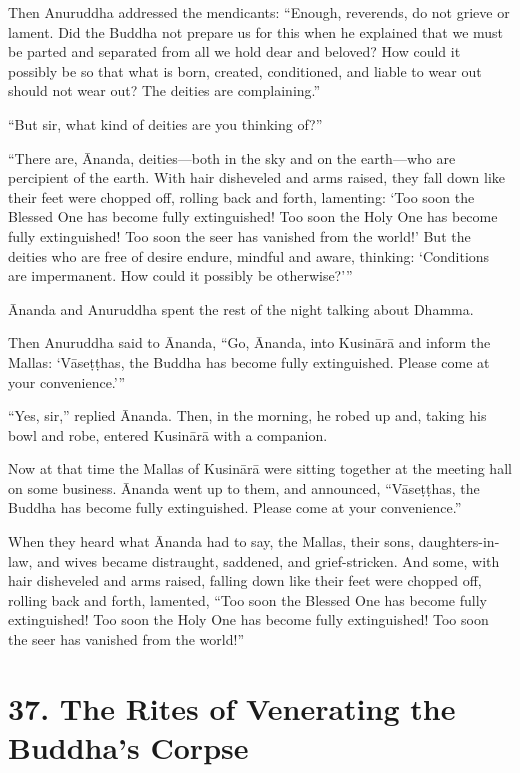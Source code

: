 \documentclass[12pt,openany]{book}%
\begin{document}
Then Anuruddha addressed the mendicants: “Enough, reverends, do not grieve or lament. Did the Buddha not prepare us for this when he explained that we must be parted and separated from all we hold dear and beloved? How could it possibly be so that what is born, created, conditioned, and liable to wear out should not wear out? The deities are complaining.” 

“But sir, what kind of deities are you thinking of?” 

“There are, Ānanda, deities—both in the sky and on the earth—who are percipient of the earth. With hair disheveled and arms raised, they fall down like their feet were chopped off, rolling back and forth, lamenting: ‘Too soon the Blessed One has become fully extinguished! Too soon the Holy One has become fully extinguished! Too soon the seer has vanished from the world!’ But the deities who are free of desire endure, mindful and aware, thinking: ‘Conditions are impermanent. How could it possibly be otherwise?’” 

Ānanda and Anuruddha spent the rest of the night talking about Dhamma. 

Then Anuruddha said to Ānanda, “Go, Ānanda, into \textsanskrit{Kusinārā} and inform the Mallas: ‘\textsanskrit{Vāseṭṭhas}, the Buddha has become fully extinguished. Please come at your convenience.’” 

“Yes, sir,” replied Ānanda. Then, in the morning, he robed up and, taking his bowl and robe, entered \textsanskrit{Kusinārā} with a companion. 

Now at that time the Mallas of \textsanskrit{Kusinārā} were sitting together at the meeting hall on some business. Ānanda went up to them, and announced, “\textsanskrit{Vāseṭṭhas}, the Buddha has become fully extinguished. Please come at your convenience.” 

When they heard what Ānanda had to say, the Mallas, their sons, daughters-in-law, and wives became distraught, saddened, and grief-stricken. And some, with hair disheveled and arms raised, falling down like their feet were chopped off, rolling back and forth, lamented, “Too soon the Blessed One has become fully extinguished! Too soon the Holy One has become fully extinguished! Too soon the seer has vanished from the world!” 

\section*{37. The Rites of Venerating the Buddha’s Corpse }
\end{document}
